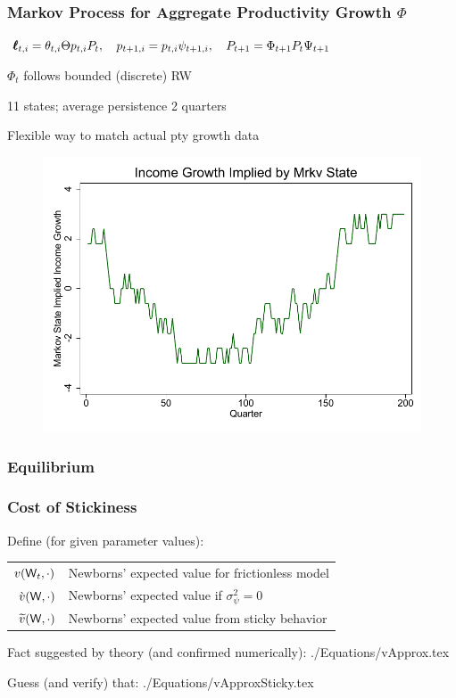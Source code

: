 \documentclass{beamer}\usepackage{dcolumn}
\providecommand{\perc}[1]{\widetilde{#1}}
\providecommand{\econtexRoot}{.}
\providecommand{\eq}{\econtexRoot/Equations}
\begin{document}
\normalsize



\begin{frame}
  \frametitle{Markov Process for Aggregate Productivity Growth $\Phi$}

$
\pmb{\ell}_{t,i} = \theta_{t,i}\Theta p_{t,i} {P}_{t},\quad
p_{t+1,i} =  {{p}}_{t,i} \psi_{t+1,i},  \quad
 {P}_{t+1} =  \Phi_{t+1} {P}_{t}\Psi_{t+1}
$
\bi
\item $\Phi_t$ follows bounded (discrete) RW
\item 11 states; average persistence 2 quarters
\item Flexible way to match actual pty growth data
\ei
  \begin{figure}
\begin{center}
\includegraphics[width=.75\textwidth]{../Figures/MrkvStateGrowth}
\end{center}
\end{figure}

\end{frame}



\begin{frame}
\frametitle{Equilibrium}

\footnotesize


\end{frame}


\begin{frame}
\frametitle{Cost of Stickiness}
Define (for given parameter values):
\begin{center}
\begin{tabular}{rl}
${v}(\mathsf{W}_t,\cdot)$ & Newborns' expected value for frictionless model
\\ $\grave{v}(\mathsf{W},\cdot)$ & Newborns' expected value if $\sigma^{2}_{\psi}=0$
\\ $\perc{v}(\Wage,\cdot)$ & Newborns' expected value from sticky behavior
\end{tabular}
\end{center}

Fact suggested by theory (and confirmed numerically):
 \eq/vApprox.tex

Guess (and verify) that:
 \eq/vApproxSticky.tex


\end{frame}
\end{document}
